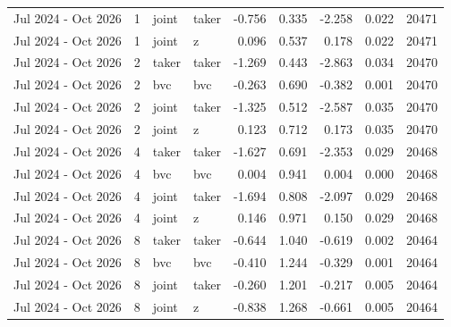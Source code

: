 \begin{tabular}{lrllrrrrr}
Jul 2024 - Oct 2026 & 1 & joint & taker & -0.756 & 0.335 & -2.258 & 0.022 & 20471 \\
Jul 2024 - Oct 2026 & 1 & joint & z & 0.096 & 0.537 & 0.178 & 0.022 & 20471 \\
Jul 2024 - Oct 2026 & 2 & taker & taker & -1.269 & 0.443 & -2.863 & 0.034 & 20470 \\
Jul 2024 - Oct 2026 & 2 & bvc & bvc & -0.263 & 0.690 & -0.382 & 0.001 & 20470 \\
Jul 2024 - Oct 2026 & 2 & joint & taker & -1.325 & 0.512 & -2.587 & 0.035 & 20470 \\
Jul 2024 - Oct 2026 & 2 & joint & z & 0.123 & 0.712 & 0.173 & 0.035 & 20470 \\
Jul 2024 - Oct 2026 & 4 & taker & taker & -1.627 & 0.691 & -2.353 & 0.029 & 20468 \\
Jul 2024 - Oct 2026 & 4 & bvc & bvc & 0.004 & 0.941 & 0.004 & 0.000 & 20468 \\
Jul 2024 - Oct 2026 & 4 & joint & taker & -1.694 & 0.808 & -2.097 & 0.029 & 20468 \\
Jul 2024 - Oct 2026 & 4 & joint & z & 0.146 & 0.971 & 0.150 & 0.029 & 20468 \\
Jul 2024 - Oct 2026 & 8 & taker & taker & -0.644 & 1.040 & -0.619 & 0.002 & 20464 \\
Jul 2024 - Oct 2026 & 8 & bvc & bvc & -0.410 & 1.244 & -0.329 & 0.001 & 20464 \\
Jul 2024 - Oct 2026 & 8 & joint & taker & -0.260 & 1.201 & -0.217 & 0.005 & 20464 \\
Jul 2024 - Oct 2026 & 8 & joint & z & -0.838 & 1.268 & -0.661 & 0.005 & 20464 \\
\bottomrule
\end{tabular}
